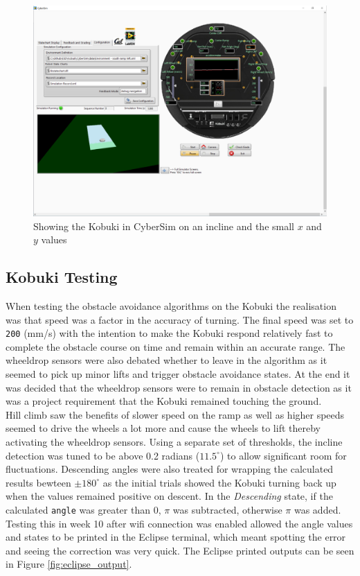 \begin{figure}[H]
    \centering
    \includegraphics[width=14cm]{Images/CyberSimSlope.png}
    \caption{Showing the Kobuki in CyberSim on an incline and the small $x$ and $y$ values}
    \label{fig:cybersim_hillclimb}
\end{figure}

\subsection{Kobuki Testing}\label{sec:hill_test}
\vspace{-0.2cm} When testing the obstacle avoidance algorithms on the Kobuki the realisation was that speed was a factor in the accuracy of turning. The final speed was set to \texttt{200} (mm/s) with the intention to make the Kobuki respond relatively fast to complete the obstacle course on time and remain within an accurate range. The wheeldrop sensors were also debated whether to leave in the algorithm as it seemed to pick up minor lifts and trigger obstacle avoidance states. At the end it was decided that the wheeldrop sensors were to remain in obstacle detection as it was a project requirement that the Kobuki remained touching the ground.\\

Hill climb saw the benefits of slower speed on the ramp as well as higher speeds seemed to drive the wheels a lot more and cause the wheels to lift thereby activating the wheeldrop sensors. Using a separate set of thresholds, the incline detection was tuned to be above 0.2 radians ($11.5^\circ$) to allow significant room for fluctuations. Descending angles were also treated for wrapping the calculated results bewteen $\pm 180^\circ$ as the initial trials showed the Kobuki turning back up when the values remained positive on descent. In the \textit{Descending} state, if the calculated \texttt{angle} was greater than 0, $\pi$ was subtracted, otherwise $\pi$ was added. Testing this in week 10 after wifi connection was enabled allowed the angle values and states to be printed in the Eclipse terminal, which meant spotting the error and seeing the correction was very quick. The Eclipse printed outputs can be seen in Figure \ref{fig:eclipse_output}.\\

